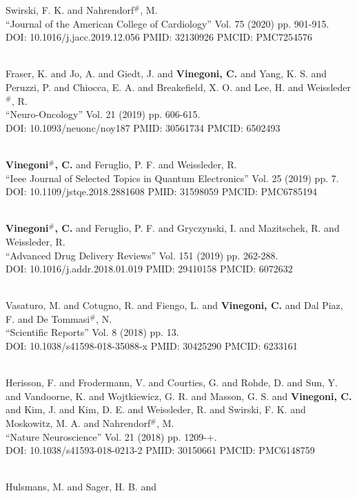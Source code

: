 Swirski, F. K. and Nahrendorf$^\#$, M. \\ ``Journal of the American College of Cardiology'' Vol. 75 (2020) pp. 901-915. \\ DOI: 10.1016/j.jacc.2019.12.056 PMID: 32130926 PMCID: PMC7254576\item {} \\ Fraser, K. and Jo, A. and Giedt, J. and {\bf Vinegoni, C.} and Yang, K. S. and Peruzzi, P. and Chiocca, E. A. and Breakefield, X. O. and Lee, H. and Weissleder$^\#$, R. \\ ``Neuro-Oncology'' Vol. 21 (2019) pp. 606-615. \\ DOI: 10.1093/neuonc/noy187 PMID: 30561734 PMCID: 6502493\item {} \\ {\bf Vinegoni$^\#$, C.} and Feruglio, P. F. and Weissleder, R. \\ ``Ieee Journal of Selected Topics in Quantum Electronics'' Vol. 25 (2019) pp. 7. \\ DOI: 10.1109/jstqe.2018.2881608 PMID: 31598059 PMCID: PMC6785194\item {} \\ {\bf Vinegoni$^\#$, C.} and Feruglio, P. F. and Gryczynski, I. and Mazitschek, R. and Weissleder, R. \\ ``Advanced Drug Delivery Reviews'' Vol. 151 (2019) pp. 262-288. \\ DOI: 10.1016/j.addr.2018.01.019 PMID: 29410158 PMCID: 6072632\item {} \\ Vasaturo, M. and Cotugno, R. and Fiengo, L. and {\bf Vinegoni, C.} and Dal Piaz, F. and De Tommasi$^\#$, N. \\ ``Scientific Reports'' Vol. 8 (2018) pp. 13. \\ DOI: 10.1038/s41598-018-35088-x PMID: 30425290 PMCID: 6233161\item {} \\ Herisson, F. and Frodermann, V. and Courties, G. and Rohde, D. and Sun, Y. and Vandoorne, K. and Wojtkiewicz, G. R. and Masson, G. S. and {\bf Vinegoni, C.} and Kim, J. and Kim, D. E. and Weissleder, R. and Swirski, F. K. and Moskowitz, M. A. and Nahrendorf$^\#$, M. \\ ``Nature Neuroscience'' Vol. 21 (2018) pp. 1209-+. \\ DOI: 10.1038/s41593-018-0213-2 PMID: 30150661 PMCID: PMC6148759 \item {} \\ Hulsmans, M. and Sager, H. B. and 